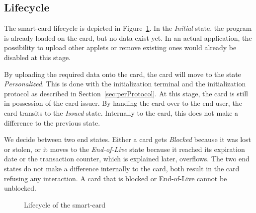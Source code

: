 \documentclass{article}
\begin{document}
\subsection{Lifecycle}
The smart-card lifecycle is depicted in Figure~\ref{fig:lifecycle}.
In the \emph{Initial} state, the program is already loaded on the card, but no data exist yet.
In an actual application, the possibility to upload other applets or remove existing ones would already be disabled at this stage.

By uploading the required data onto the card, the card will move to the state \emph{Personalized}.
This is done with the initialization terminal and the initialization protocol as described in Section~\ref{sec:perProtocol}.
At this stage, the card is still in possession of the card issuer.
By handing the card over to the end user, the card transits to the \emph{Issued} state.
Internally to the card, this does not make a difference to the previous state.

We decide between two end states.
Either a card gets \emph{Blocked} because it was lost or stolen, or it moves to the \emph{End-of-Live} state because it reached its expiration date or the transaction counter, which is explained later, overflows.
The two end states do not make a difference internally to the card, both result in the card refusing any interaction.
A card that is blocked or End-of-Live cannot be unblocked.

\begin{figure}
    \centering
    
    \caption{Lifecycle of the smart-card}
    \label{fig:lifecycle}
\end{figure}
\end{document}
